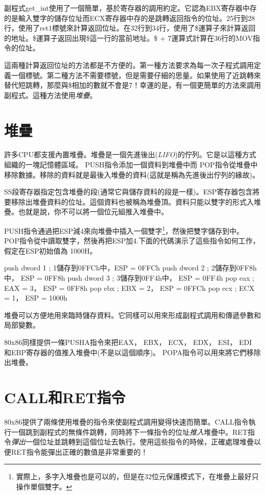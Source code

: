 副程式{\code get\_int}使用了一個簡單，基於寄存器的調用約定。它認為EBX寄存器中存的是輸入雙字的儲存位址而ECX寄存器中存的是跳轉返回指令的位址。25行到28行，使用了{\code ret1}標號來計算返回位址。在32行到34行，使用了{\code \$}運算子來計算返回的地址。{\code \$}運算子返回出現\$這一行的當前地址。{\code \$ + 7}運算式計算在36行的{\code MOV}指令的位址。

這兩種計算返回位址的方法都是不方便的。第一種方法要求為每一次子程式調用定義一個標號。第二種方法不需要標號，但是需要仔細的思量。如果使用了近跳轉來替代短跳轉，那麼與{\code \$}相加的數就不會是7！幸運的是，有一個更簡單的方法來調用副程式。這種方法使用\emph{堆疊}。

\section{堆疊}

許多CPU都支援內置堆疊。堆疊是一個先進後出(\emph{LIFO})的佇列。它是以這種方式組織的一塊記憶體區域。{\code
PUSH}指令添加一個資料到堆疊中而 {\code
POP}指令從堆疊中移除數據。移除的資料就是最後入堆疊的資料(這就是稱為先進後出佇列的緣故)。

SS段寄存器指定包含堆疊的段(通常它與儲存資料的段是一樣)。ESP寄存器包含將要移除出堆疊資料的位址。這個資料也被稱為堆疊頂。資料只能以雙字的形式入堆疊。也就是說，你不可以將一個位元組推入堆疊中。

{\code
PUSH}指令通過把ESP減4來向堆疊中插入一個雙字\footnote{實際上，多字入堆疊也是可以的，但是在32位元保護模式下，在堆疊上最好只操作單個雙字。}，然後把雙字儲存到{\code
[ESP]}中。 {\code POP}指令從{\code
[ESP]}中讀取雙字，然後再把ESP加4.下面的代碼演示了這些指令如何工作，假定在ESP初始值為{\code
1000H}。
\begin{AsmCodeListing}[frame=none]
      push   dword 1    ; 1儲存到0FFCh中，ESP = 0FFCh
      push   dword 2    ; 2儲存到0FF8h中， ESP = 0FF8h
      push   dword 3    ; 3儲存到0FF4h中， ESP = 0FF4h
      pop    eax        ; EAX = 3， ESP = 0FF8h
      pop    ebx        ; EBX = 2， ESP = 0FFCh
      pop    ecx        ; ECX = 1， ESP = 1000h
\end{AsmCodeListing}

堆疊可以方便地用來臨時儲存資料。它同樣可以用來形成副程式調用和傳遞參數和局部變數。

80x86同樣提供一條{\code PUSHA}指令來把EAX， EBX， ECX， EDX， ESI，
EDI\\和EBP寄存器的值推入堆疊中(不是以這個順序)。 {\code
POPA}指令可以用來將它們移除出堆疊。 

\section{CALL和RET指令}
80x86提供了兩條使用堆疊的指令來使副程式調用變得快速而簡單。CALL指令執行一個跳到副程式的無條件跳轉，同時將下一條指令的位址\emph{推入}堆疊中。RET指令\emph{彈出}一個位址並跳轉到這個位址去執行。使用這些指令的時候，正確處理堆疊以便RET指令能彈出正確的數值是非常重要的！

